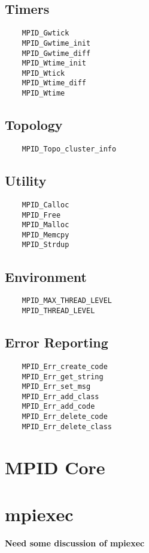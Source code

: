 \documentclass{article}
\begin{document}
\subsection{Timers}
\begin{verbatim}
    MPID_Gwtick
    MPID_Gwtime_init
    MPID_Gwtime_diff
    MPID_Wtime_init
    MPID_Wtick
    MPID_Wtime_diff
    MPID_Wtime
\end{verbatim}

\subsection{Topology}
\begin{verbatim}
    MPID_Topo_cluster_info
\end{verbatim}

\subsection{Utility}
\begin{verbatim}
    MPID_Calloc
    MPID_Free
    MPID_Malloc
    MPID_Memcpy
    MPID_Strdup
\end{verbatim}

\subsection{Environment}
\begin{verbatim}
    MPID_MAX_THREAD_LEVEL
    MPID_THREAD_LEVEL
\end{verbatim}

\subsection{Error Reporting}
\begin{verbatim}
    MPID_Err_create_code
    MPID_Err_get_string
    MPID_Err_set_msg
    MPID_Err_add_class
    MPID_Err_add_code
    MPID_Err_delete_code
    MPID_Err_delete_class
\end{verbatim}

\section{MPID Core}



\section{mpiexec}
\textbf{Need some discussion of mpiexec}
\end{document}
